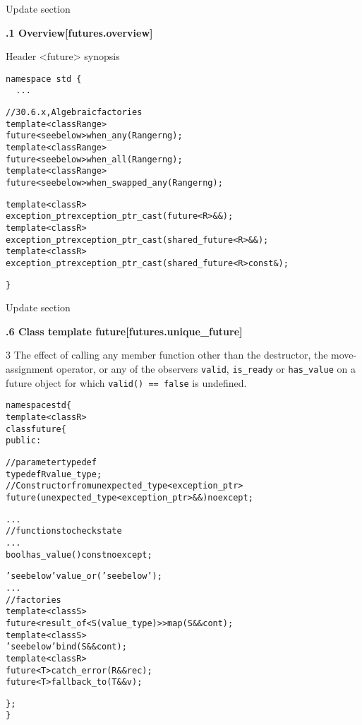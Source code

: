 \documentclass[a4paper,10pt]{article}
\newcommand{\wordingUpdateSubSubSec}[2]{\vspace{15pt}
\noindent
{\textbf{\quad #1\hfill\textbf{[#2]}}}
\label{#2}
\vspace{7pt}
}
\newcommand{\cpp}[1]{\lstinline{#1}}
\newcommand{\add}[1]{\textcolor{dkgreen}{#1}}
\newcommand{\update}[1]{\colorbox{update_color}{#1}}
\begin{document}
\noindent
Update section

\wordingUpdateSubSubSec{30.6.1 Overview}{futures.overview}

\noindent
Header <future> synopsis

\begin{lstlisting}[xleftmargin=0pt]
namespace std {
  ...
\end{lstlisting}
\begin{alltt}
\add{
  // 30.6.x, Algebraic factories
  template <class Range>
  future<see below> when_any(Range rng);
  template <class Range>
  future<see below> when_all(Range rng);
  template <class Range>
  future<see below> when_swapped_any(Range rng);
  

\update{  template <class R>}
\update{  exception_ptr exception_ptr_cast(future<R>&&);}
\update{  template <class R>}
\update{  exception_ptr exception_ptr_cast(shared_future<R>&&);}
\update{  template <class R>}
\update{  exception_ptr exception_ptr_cast(shared_future<R> const&);}

}  
\end{alltt}
\begin{lstlisting}[xleftmargin=0pt]
}
\end{lstlisting}

\noindent
Update section

\wordingUpdateSubSubSec{30.6.6 Class template future}{futures.unique_future}

3 The effect of calling any member function other than the destructor, the move-assignment operator, or \add{any of the observers} \cpp{valid}, \cpp{is_ready} or \add{\cpp{has_value}} on a future object for which \cpp{valid() == false} is undefined.

\begin{alltt}
namespace std \{
  template <class R>
  class future \{
  public:
\add{
    // parameter typedef
    typedef R value_type;
    // Constructor from unexpected_type<exception_ptr> 
    future(unexpected_type<exception_ptr>&&) noexcept;  

  ...
    // functions to check state
    ...
    bool has_value() const noexcept;

    'see below' value_or('see below');
  ...
    // factories
    template <class S>
      future<result_of<S(value_type)>> map(S&& cont);
    template <class S>
      'see below' bind(S&& cont);
    template <class R>
      future<T> catch_error(R&& rec);
    future<T> fallback_to(T&& v);
}
  \};
\}
\end{alltt}
\end{document}
